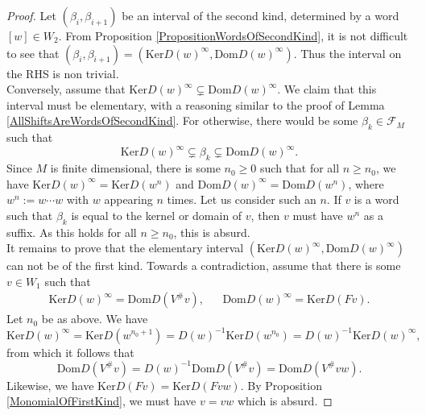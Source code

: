 \documentclass[12pt]{amsart}
\theoremstyle{definition}
\newcommand{\<}{\langle}   %
\renewcommand{\>}{\rangle} %
\begin{document}
\begin{proof}
    Let $(\beta_i,\beta_{i+1})$ be an interval of the second kind, determined by a word $[w] \in W_2$. From Proposition \ref{PropositionWordsOfSecondKind}, it is not difficult to see that $(\beta_i,\beta_{i+1})=(\mathrm{Ker}D(w)^{\infty}, \mathrm{Dom}D(w)^{\infty})$. Thus the interval on the RHS is non trivial. \\
    Conversely, assume that $\mathrm{Ker}D(w)^{\infty} \subsetneq \mathrm{Dom}D(w)^{\infty}$. We claim that this interval must be elementary, with a reasoning similar to the proof of Lemma \ref{AllShiftsAreWordsOfSecondKind}. For otherwise, there would be some $\beta_k \in \mathcal F_M$ such that 
    \begin{equation*}
        \mathrm{Ker}D(w)^{\infty} \subsetneq \beta_k \subsetneq \mathrm{Dom}D(w)^{\infty}.
    \end{equation*}
    Since $M$ is finite dimensional, there is some $n_0 \geq 0$ such that for all $n\geq n_0$, we have $\mathrm{Ker}D(w)^{\infty} = \mathrm{Ker}D(w^n)$ and $\mathrm{Dom}D(w)^{\infty} = \mathrm{Dom}D(w^n)$, where $w^n := w \cdots w$ with $w$ appearing $n$ times. Let us consider such an $n$. If $v$ is a word such that $\beta_k$ is equal to the kernel or domain of $v$, then $v$ must have $w^n$ as a suffix. As this holds for all $n \geq n_0$, this is absurd. \\
    It remains to prove that the elementary interval $(\mathrm{Ker}D(w)^{\infty}, \mathrm{Dom}D(w)^{\infty})$ can not be of the first kind. Towards a contradiction, assume that there is some $v \in W_1$ such that 
    \begin{align*}
        \mathrm{Ker}D(w)^{\infty} = \mathrm{Dom}D(V^{\#}v), & & \mathrm{Dom}D(w)^{\infty} = \mathrm{Ker}D(Fv).
    \end{align*}
    Let $n_0$ be as above. We have 
    \begin{equation*}
        \mathrm{Ker}D(w)^{\infty} = \mathrm{Ker}D(w^{n_0+1}) = D(w)^{-1} \mathrm{Ker}D(w^{n_0}) = D(w)^{-1}\mathrm{Ker}D(w)^{\infty},
    \end{equation*}
    from which it follows that 
    \begin{equation*}
        \mathrm{Dom}D(V^{\#}v) = D(w)^{-1}\mathrm{Dom}D(V^{\#}v) = \mathrm{Dom}D(V^{\#}vw).
    \end{equation*}
    Likewise, we have $\mathrm{Ker}D(Fv) = \mathrm{Ker}D(Fvw)$. By Proposition \ref{MonomialOfFirstKind}, we must have $v = vw$ which is absurd.
\end{proof}
\end{document}
